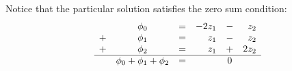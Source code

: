 Notice that the particular solution satisfies the zero sum condition:
\begin{equation}
  \begin{array}{cccrcrcccccc}
     &\phi_{0}&=&-2z_{1}&-&z_{2}\\
    +&\phi_{1}&=&z_{1}&-&z_{2}\\
    +&\phi_{2}&=&z_{1}&+&2z_{2}\\\hline
     &\phi_{0}+\phi_{1}+\phi_{2}&=&&0
  \end{array}
\end{equation}

\endinput